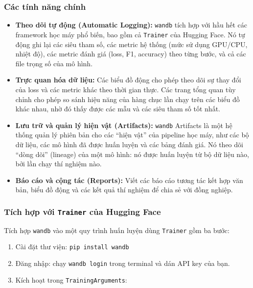 \subsubsection{Các tính năng chính}
\begin{itemize}
    \item \textbf{Theo dõi tự động (Automatic Logging):} \texttt{wandb} tích hợp với hầu hết các framework học máy phổ biến, bao gồm cả \texttt{Trainer} của Hugging Face. Nó tự động ghi lại các siêu tham số, các metric hệ thống (mức sử dụng GPU/CPU, nhiệt độ), các metric đánh giá (loss, F1, accuracy) theo từng bước, và cả các file trọng số của mô hình.
    \item \textbf{Trực quan hóa dữ liệu:} Các biểu đồ động cho phép theo dõi sự thay đổi của loss và các metric khác theo thời gian thực. Các trang tổng quan tùy chỉnh cho phép so sánh hiệu năng của hàng chục lần chạy trên các biểu đồ khác nhau, nhờ đó thấy được các mẫu và các siêu tham số tốt nhất.
    \item \textbf{Lưu trữ và quản lý hiện vật (Artifacts):} \texttt{wandb} Artifacts là một hệ thống quản lý phiên bản cho các “hiện vật” của pipeline học máy, như các bộ dữ liệu, các mô hình đã được huấn luyện và các bảng đánh giá. Nó theo dõi “dòng dõi” (lineage) của một mô hình: nó được huấn luyện từ bộ dữ liệu nào, bởi lần chạy thí nghiệm nào.
    \item \textbf{Báo cáo và cộng tác (Reports):} Viết các báo cáo tương tác kết hợp văn bản, biểu đồ động và các kết quả thí nghiệm để chia sẻ với đồng nghiệp.
\end{itemize}

\subsubsection{Tích hợp với \texttt{Trainer} của Hugging Face}
Tích hợp \texttt{wandb} vào một quy trình huấn luyện dùng \texttt{Trainer} gồm ba bước:
\begin{enumerate}
    \item Cài đặt thư viện: \texttt{pip install wandb}
    \item Đăng nhập: chạy \texttt{wandb login} trong terminal và dán API key của bạn.
    \item Kích hoạt trong \texttt{TrainingArguments}:
\end{enumerate}

